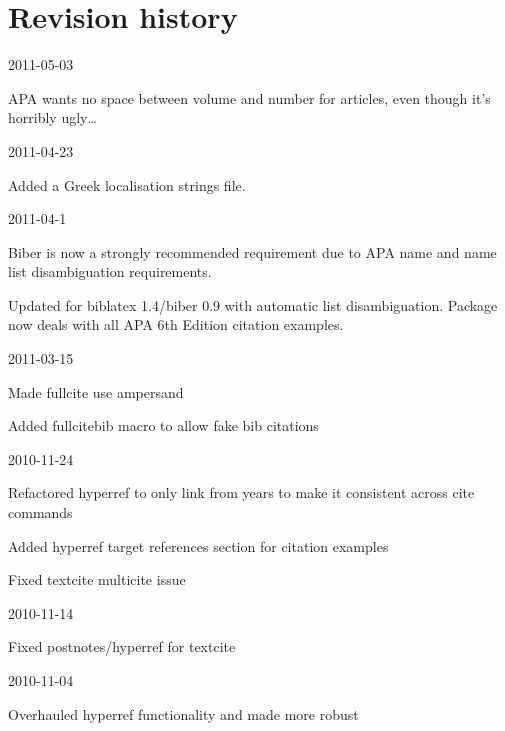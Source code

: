 \documentclass{ltxdockit}
\begin{document}
\section{Revision history}

\begin{changelog}

\begin{release}{2.8}{2011-05-03}
\item APA wants no space between volume and number for articles, even though it's
  horribly ugly\ldots
\end{release}

\begin{release}{2.8}{2011-04-23}
\item Added a Greek localisation strings file.
\end{release}

\begin{release}{2.7}{2011-04-1}
\item Biber is now a strongly recommended requirement due to APA name and
  name list disambiguation requirements.
\item Updated for biblatex 1.4/biber 0.9 with automatic list
  disambiguation. Package now deals with all APA 6th Edition citation examples.
\end{release}

\begin{release}{2.6}{2011-03-15}
\item Made fullcite use ampersand
\item Added fullcitebib macro to allow fake bib citations
\end{release}

\begin{release}{2.5}{2010-11-24}
\item Refactored hyperref to only link from years to make it
  consistent across cite commands
\item Added hyperref target references section for citation examples
\item Fixed textcite multicite issue
\end{release}

\begin{release}{2.4}{2010-11-14}
\item Fixed postnotes/hyperref for textcite
\end{release}

\begin{release}{2.3}{2010-11-04}
\item Overhauled hyperref functionality and made more robust
\end{release}


\end{changelog}
\end{document}
